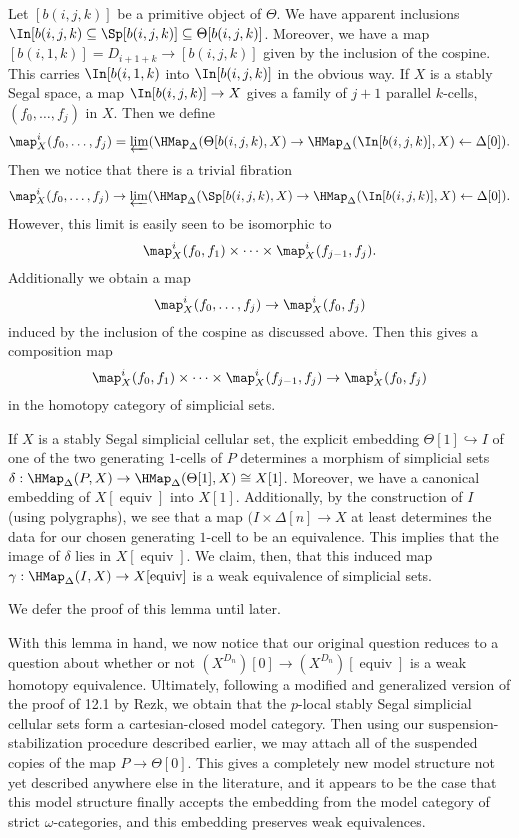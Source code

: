 Let \([b(i,j,k)]\) be a primitive object of \(\Theta\). We have apparent inclusions \(\In[b(i,j,k)\subseteq \Sp[b(i,j,k)] \subseteq \Theta[b(i,j,k)]\).  Moreover, we have a map \([b(i,1,k)]=D_{i+1+k}\to [b(i,j,k)]\) given by the inclusion of the cospine.  This carries \(\In[b(i,1,k)\) into \(\In[b(i,j,k)]\) in the obvious way. If \(X\) is a stably Segal space, a map \(\In[b(i,j,k)]\to X\) gives a family of \(j+1\) parallel \(k\)-cells, \((f_0,\dots,f_ j)\) in \(X\).  Then we define \[\map^i_X(f_0,\dots,f_j) =\varprojlim(\HMap_\Delta(\Theta[b(i,j,k),X) \to \HMap_\Delta(\In[b(i,j,k)],X) \leftarrow \Delta[0]).\]  Then we notice that there is a trivial fibration \[\map^i_X(f_0,\dots,f_j) \to \varprojlim(\HMap_\Delta(\Sp[b(i,j,k),X) \to \HMap_\Delta(\In[b(i,j,k)],X) \leftarrow \Delta[0]).\]  However, this limit is easily seen to be isomorphic to \[\map^i_X(f_0,f_1)\times \cdots \times \map^i_X(f_{j-1},f_j).\]  Additionally we obtain a map \[\map^i_X(f_0,\dots,f_j)\to \map^i_X(f_0,f_j)\] induced by the inclusion of the cospine as discussed above.  Then this gives a composition map \[\map^i_X(f_0,f_1)\times \cdots \times \map^i_X(f_{j-1},f_j) \to \map^i_X(f_0,f_j)\] in the homotopy category of simplicial sets.  



\begin{lemma} 
 If \(X\) is a stably Segal simplicial cellular set, the explicit embedding \(\Theta[1]\hookrightarrow I\) of one of the two generating \(1\)-cells of \(P\) determines a morphism of simplicial sets \(\delta:\HMap_\Delta(P, X)\to \HMap_\Delta(\Theta[1],X) \cong X[1]\).  Moreover, we have a canonical embedding of \(X[\operatorname{equiv}]\) into \(X[1]\).  Additionally, by the construction of \(I\) (using polygraphs), we see that a map \((I\times \Delta[n] \to X\) at least determines the data for our chosen generating \(1\)-cell to be an equivalence.  This implies that the image of \(\delta\) lies in \(X[\operatorname{equiv}]\).  We claim, then, that this induced map \(\gamma:\HMap_\Delta(I,X)\to X[\operatorname{equiv}]\) is a weak equivalence of simplicial sets.
\end{lemma}
We defer the proof of this lemma until later.



With this lemma in hand, we now notice that our original question reduces to a question about whether or not \((X^{D_n})[0] \to (X^{D_n})[\operatorname{equiv}]\) is a weak homotopy equivalence.  Ultimately, following a modified and generalized version of the proof of \cite{rezk-segal-spaces}{12.1} by Rezk, we obtain that the \(p\)-local stably Segal simplicial cellular sets form a cartesian-closed model category.  Then using our suspension-stabilization procedure described earlier, we may attach all of the suspended copies of the map \(P\to \Theta[0]\).  This gives a completely new model structure not yet described anywhere else in the literature, and it appears to be the case that this model structure finally accepts the embedding from the model category of strict \(\omega\)-categories, and this embedding preserves weak equivalences. 

